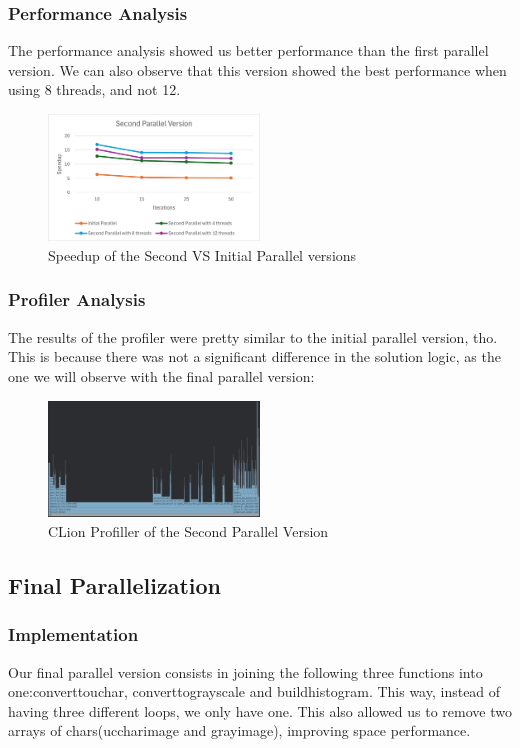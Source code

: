 \documentclass[sigconf]{acmart}
\begin{document}
\subsubsection{Performance Analysis}
The performance analysis showed us better performance than the first parallel version. We can also observe that this version showed the best performance when using 8 threads, and not 12.
\begin{figure}[h]
    \centering
    \includegraphics[width=0.5\textwidth]{SecondParallelSpeedup.png}
    \caption{Speedup of the Second VS Initial Parallel versions}
\end{figure}

\subsubsection{Profiler Analysis}
The results of the profiler were pretty similar to the initial parallel version, tho. This is because there was not a significant difference in the solution logic, as the one we will observe with the final parallel version:
\begin{figure}[h]
    \centering
    \includegraphics[width=0.5\textwidth]{SecondParallelProfiler.png}
    \caption{CLion Profiller of the Second Parallel Version}
\end{figure}
\subsection{Final Parallelization}
\subsubsection{Implementation}
Our final parallel version consists in joining the following three functions into one:convert\textunderscore to\textunderscore uchar, convert\textunderscore to\textunderscore grayscale and build\textunderscore histogram. This way, instead of having three different loops, we only have one. This also allowed us to remove two arrays of chars(ucchar\textunderscore image and gray\textunderscore image), improving space performance.
\end{document}
